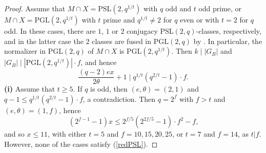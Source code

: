 \documentclass[a4paper,twopage,reqno,12pt]{amsart}
\theoremstyle{definition}
\numberwithin{equation}{section}
\newcommand{\PSL}{\mathrm{PSL}}
\newcommand{\PGL}{\mathrm{PGL}}
\renewcommand{\leq}{\leqslant}
\renewcommand{\geq}{\geqslant}
\begin{document}
\begin{proof}
Assume that $M\cap X=\PSL(2,q^{1/t})$  with $q$ odd and $t$ odd prime, or $M\cap X=\PGL(2,q^{1/t})$ with $t$ prime and $q^{1/t} \neq 2$ for $q$ even or with $t=2$ for $q$ odd. %
In these cases, there are $1$, $1$ or $2$ conjugacy $\PSL(2,q)$-classes, respectively, and in the latter case the $2$ classes are fused in $\PGL(2,q)$ by \cite[§260]{Di}. In particular, the normalizer in $\PGL(2,q)$ of $M\cap X$ is $\PGL(2,q^{1/t})$. Then $k \mid \left\vert G_B \right\vert$ and $\left\vert G_B \right\vert \mid \left\vert \PGL(2,q^{1/t}) \right\vert \cdot f$, and hence 
\begin{equation}\label{redPSL}
\frac{\left( q-2\right) ex}{2\theta }+1\mid q^{1/t}(q^{2/t}-1)\cdot f\text{.} 
\end{equation}
\noindent \textbf{(i)} Assume that $t\geq 5$. If $q$ is odd, then $(e,\theta )=(2,1)$ and $q-1 \leq q^{1/t}(q^{2/t}-1)\cdot f\text{,}$ a contradiction. Then $q=2^{f}$ with $f>t$ and $(e,\theta )=(1,f)$,
hence
$$(2^{f-1}-1)x \leq 2^{f/5}(2^{2f/5}-1)\cdot f^{2}-f\text{,}$$
and so $x \leq 11$, with either $t=5$ and $f = 10,15,20,25$, or $t=7$ and $f= 14$, as $t|f$. However, none of the cases satisfy (\ref{redPSL}). 



\end{proof}
\end{document}
